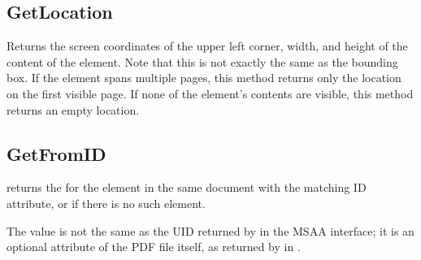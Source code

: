 \documentclass[letterpaper,12pt,english,openany,oneside]{sphinxmanual}
\begin{document}
\begin{sphinxVerbatim}[commandchars=\\\{\}]
                    
\end{sphinxVerbatim}


\subsection{GetLocation}
\label{\detokenize{Access_DOM:getlocation}}
Returns the screen coordinates of the upper left corner, width, and height of the content of the element. Note that this is not exactly the same as the bounding box. If the element spans multiple pages, this method returns only the location on the first visible page. If none of the element’s contents are visible, this method returns an empty location.

\begin{sphinxVerbatim}[commandchars=\\\{\}]
           
\end{sphinxVerbatim}


\subsection{GetFromID}
\label{\detokenize{Access_DOM:getfromid}}
 returns the  for the element in the same document with the matching ID attribute, or  if there is no such element.

The  value is not the same as the UID returned by  in the MSAA interface; it is an optional attribute of the PDF file itself, as returned by  in  .

\begin{sphinxVerbatim}[commandchars=\\\{\}]
      
\end{sphinxVerbatim}
\end{document}
